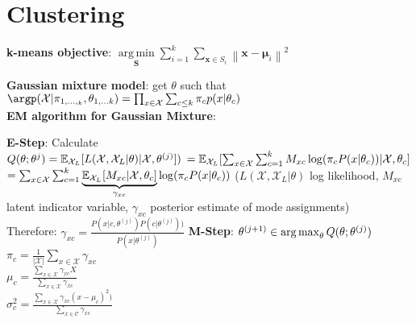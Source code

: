 \section{Clustering}

\textbf{k-means objective}: $\underset{\mathbf{S}} {\operatorname{arg\,min}}  \sum_{i=1}^{k} \sum_{\mathbf x \in S_i} \left\| \mathbf x - \boldsymbol\mu_i \right\|^2$

\textbf{Gaussian mixture model}: get $\theta$ such that\\
$\argp(\mathcal{X}|\pi_{1,...,_k},\theta_{1,...k})=\prod_{x\in\mathcal{X}}\sum_{c\leq k}\pi_c p(x|\theta_c)$\\


\textbf{EM algorithm for Gaussian Mixture}:

\begin{algorithmic}[1]
	\State \textbf{E-Step}: Calculate\\
        $Q(\theta;\theta^{j})=\mathbb E_{\mathcal{X}_L}[L(\mathcal{X},\mathcal{X}_L|\theta)|\mathcal{X},\theta^{(j)}])$
        $=\mathbb E_{\mathcal{X}_L}[\sum_{x\in\mathcal{X}}\sum_{c=1}^k M_{xc}\log(\pi_c P(x|\theta_c))|\mathcal{X},\theta_c]$ 
        $=\sum_{x\in\mathcal{X}}\sum_{c=1}^k\underbrace{\mathbb E_{\mathcal{X}_L}[M_{xc}|\mathcal{X},\theta_c]}_{\gamma_{xc}}\log(\pi_c P(x|\theta_c))$
        ($L(\mathcal{X},\mathcal{X}_L|\theta)$ log likelihood, $M_{xc}$ latent indicator variable, $\gamma_{xc}$ posterior estimate of mode assignments)\\
        Therefore: $\gamma_{xc}=\frac{P(x|c,\theta^{(j)})P(c|\theta^{(j)}))}{P(x|\theta^{(j)})}$
	\State \textbf{M-Step}: $\theta^{(j+1)}\in \operatorname*{arg\,max}_\theta Q(\theta; \theta^{(j)})$\\
	$\pi_c=\frac{1}{|\mathcal{X}|}\sum_{x\in\mathcal{X}}\gamma_{xc}$\\
	$\mu_c=\frac{\sum_{x\in\mathcal{X}}\gamma_{xc}X}{\sum_{x\in\mathcal{X}}\gamma_{xc}}$\\
	$\sigma^2_c=\frac{\sum_{x\in\mathcal{X}}\gamma_{xc}(x-\mu_c)^2)}{\sum_{x\in\mathcal{C}}\gamma_{xc}}$
	\EndWhile
\end{algorithmic}



